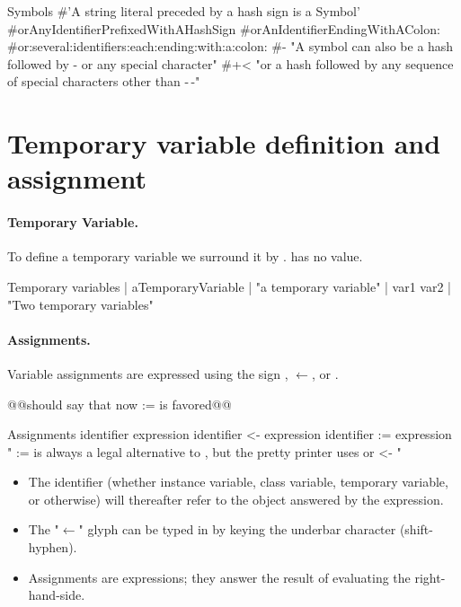 \documentclass[a4paper,10pt,twoside]{book}
\begin{document}
\begin{script}{Symbols}
#'A string literal preceded by a hash sign is a Symbol'
#orAnyIdentifierPrefixedWithAHashSign
#orAnIdentifierEndingWithAColon:
#or:several:identifiers:each:ending:with:a:colon:
#- "A symbol can also be a hash followed by - or any special character"
#+< "or a hash followed by any sequence of special characters other than -\,-"
\end{script}



\section{Temporary variable definition and assignment}


\paragraph{Temporary Variable.} To define a temporary variable we surround it by \lct{|}.
 has no value.

\begin{script}{Temporary variables}
| aTemporaryVariable | "a temporary variable"
| var1 var2 | "Two temporary variables"
\end{script}

\paragraph{Assignments.}
Variable assignments are expressed using the sign \lct{\_}, $\leftarrow$, or \lct{:=}.

@@should say that now := is favored@@
\begin{script}{Assignments}
identifier \lct{\_} expression
identifier <- expression
identifier :=  expression
" := is always a legal alternative to , but the pretty printer
 uses \lct{\_} or <- "
\end{script}

\begin{itemize}
\item The identifier (whether instance variable, class variable, temporary variable, or otherwise) will thereafter refer to the object answered by the expression.
\item The "$\leftarrow$" glyph can be typed in \sq by keying the underbar character (shift-hyphen).
\item Assignments are expressions; they answer the result of evaluating the right-hand-side.
\end{itemize}
\end{document}
